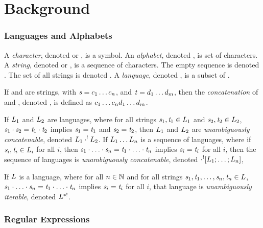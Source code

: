 \section{Background}

\subsubsection{Languages and Alphabets}

A \textit{character}, denoted \Character{} or \CharacterAlt{}, is a symbol.
An \textit{alphabet}, denoted \Alphabet{}, is set of characters.
A \textit{string}, denoted \String{} or \StringAlt{}, is a sequence of characters.
The empty sequence is denoted \EmptyString{}.
The set of all strings is denoted \StarOf{\Alphabet}.
A \textit{language}, denoted \Language{}, is a subset of \StarOf{\Alphabet}.

If \String{} and \StringAlt{} are strings, with
$\mathit{s}=c_1\ldots c_n$,
and $\mathit{t}=d_1\ldots d_m$,
then the \textit{concatenation} of \String{} and \StringAlt{},
denoted \String{}\Concat\StringAlt{}, is defined as
$c_1\ldots c_nd_1\ldots d_m$.

If $L_1$ and $L_2$ are languages, where
for all strings $\mathit{s}_1,\mathit{t}_1\in L_1$ and
$\mathit{s}_2,\mathit{t}_2\in L_2$,
$\mathit{s}_1\cdot\mathit{s}_2=\mathit{t}_1\cdot\mathit{t}_2$ implies
$\mathit{s}_1=\mathit{t}_1$ and $\mathit{s}_2=\mathit{t}_2$, then
$L_1$ and $L_2$ are \textit{unambiguously concatenable},
denoted $L_1\cdot^!L_2$.
If $L_1\ldots L_n$ is a sequence of languages, where
if $\mathit{s}_i,\mathit{t}_i\in L_i$ for all $i$, then
$\mathit{s}_1\cdot\ldots\cdot\mathit{s}_n=\mathit{t}_1\cdot\ldots\cdot\mathit{t}_n$
implies $\mathit{s}_i=\mathit{t}_i$ for all $i$, then
the sequence of languages is \textit{unambiguously concatenable},
denoted $\cdot^![L_1;\ldots;L_n]$,

If $L$ is a language, where
for all $n\in\mathbb{N}$ and for all strings
$\mathit{s}_1,\mathit{t}_1,\ldots,\mathit{s}_n,\mathit{t}_n\in L$,
$\mathit{s}_1\cdot\ldots\cdot\mathit{s}_n=\mathit{t}_1\cdot\ldots\cdot\mathit{t}_n$
implies $\mathit{s}_i=\mathit{t}_i$ for all $i$,
that language is \textit{unambiguously iterable},
denoted $L^{*!}$.

\subsubsection{Regular Expressions}

